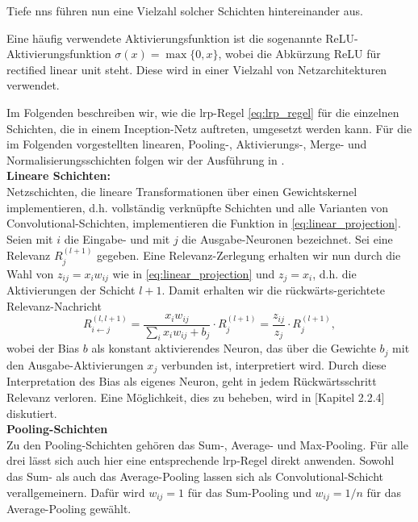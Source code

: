 \documentclass[twoside, 12pt,a4paper]{book}
\numberwithin{equation}{section}
\begin{document}
	 \noindent Tiefe \acp{nn} führen nun eine Vielzahl solcher Schichten hintereinander aus.
	 
	 \noindent Eine häufig verwendete Aktivierungsfunktion ist die sogenannte ReLU-\-Ak\-ti\-vie\-rungs\-funk\-tion  $\sigma(x) = \max{\lbrace 0,x \rbrace}$, wobei die Abkürzung ReLU für rectified linear unit steht.
	 Diese wird in einer Vielzahl von Netzarchitekturen verwendet.
	 
	 \noindent Im Folgenden beschreiben wir, wie die \ac{lrp}-Regel \eqref{eq:lrp_regel} für die einzelnen Schichten, die in einem Inception-Netz auftreten, umgesetzt werden kann. Für die im Folgenden vorgestellten linearen, Pooling-, Aktivierungs-, Merge- und Normalisierungsschichten folgen wir der Ausführung in \cite{lapuschkin}.\\
	 
	 \noindent\textbf{Lineare Schichten:}\\
	 Netzschichten, die lineare Transformationen über einen Gewichtskernel implementieren, d.h. vollständig verknüpfte Schichten und alle Varianten von Convolutional-Schichten, implementieren die Funktion in \eqref{eq:linear_projection}.\\
	 
	 \noindent Seien mit $i$ die Eingabe- und mit $j$ die Ausgabe-Neuronen bezeichnet. Sei eine Relevanz $R_j^{(l+1)}$ gegeben. Eine Relevanz-Zerlegung erhalten wir nun durch die Wahl von $z_{ij}=x_iw_{ij}$ wie in \eqref{eq:linear_projection} und $z_j = x_i$, d.h. die Aktivierungen der Schicht $l+1$. Damit erhalten wir die rückwärts-gerichtete Relevanz-Nachricht 
	 \begin{equation}
	 	R_{i\leftarrow j}^{(l,l+1)} = \frac{x_iw_{ij}}{\sum_i{x_iw_{ij}+b_j}}\cdot R_j^{(l+1)} = \frac{z_{ij}}{z_j}\cdot R_j^{(l+1)},
	 \end{equation}
	wobei der Bias $b$ als konstant aktivierendes Neuron, das über die Gewichte $b_j$ mit den Ausgabe-Aktivierungen $x_j$ verbunden ist, interpretiert wird.
	Durch diese Interpretation des Bias als eigenes Neuron, geht in jedem Rückwärtsschritt Relevanz verloren. Eine Möglichkeit, dies zu beheben, wird in \cite{lapuschkin}[Kapitel 2.2.4] diskutiert.\\
	
	
	
	\noindent\textbf{Pooling-Schichten}\\
	Zu den Pooling-Schichten gehören das Sum-, Average- und Max-Pooling. Für alle drei lässt sich auch hier eine entsprechende \ac{lrp}-Regel direkt anwenden.
	Sowohl das Sum- als auch das Average-Pooling lassen sich als Convolutional-Schicht verallgemeinern. Dafür wird $w_{ij}=1$ für das Sum-Pooling und ${w_{ij}=1/n}$ für das Average-Pooling gewählt.
	
\end{document}
